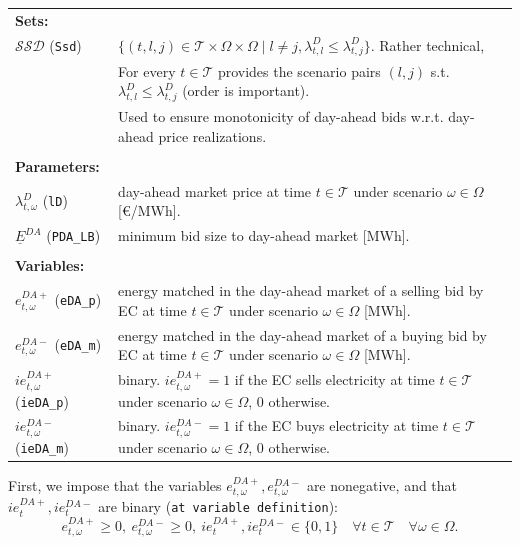 \begin{tabularx}{\textwidth}{l X}
\textbf{Sets:} \\
$\mathcal{SSD}$ (\texttt{Ssd}) & $\{(t, l, j) \in \mathcal{T} \times \Omega \times \Omega \mid l \neq j, \lambda^D_{t, l} \leq \lambda^D_{t, j} \}$. Rather technical, \\
& For every $t \in \mathcal{T}$ provides the scenario pairs $(l, j)$ s.t. $\lambda^D_{t, l} \leq \lambda^D_{t, j}$ (order is important). \\ 
& Used to ensure monotonicity of day-ahead bids w.r.t. day-ahead price realizations. \\
\\

\textbf{Parameters:} \\
$\lambda^D_{t, \omega}$ (\texttt{lD}) & day-ahead market price at time $t \in \mathcal{T}$ under scenario $\omega \in \Omega$ [\euro/MWh]. \\ 
$\underline{E}^{DA}$ (\texttt{PDA\_LB}) & minimum bid size to day-ahead market [MWh]. \\
\\

\textbf{Variables:} \\
$e^{DA+}_{t, \omega}$ (\texttt{eDA\_p}) & energy matched in the day-ahead market of a selling bid by EC at time $t \in \mathcal{T}$ under scenario $\omega \in \Omega$ [MWh]. \\ 
$e^{DA-}_{t, \omega}$ (\texttt{eDA\_m}) & energy matched in the day-ahead market of a buying bid by EC at time $t \in \mathcal{T}$ under scenario $\omega \in \Omega$ [MWh]. \\ 
$ie^{DA+}_{t, \omega}$ (\texttt{ieDA\_p}) & binary. $ie^{DA+}_{t, \omega} = 1$ if the EC sells electricity at time $t \in \mathcal{T}$ under scenario $\omega \in \Omega$, $0$ otherwise. \\ 
$ie^{DA-}_{t, \omega}$ (\texttt{ieDA\_m}) & binary. $ie^{DA-}_{t, \omega} = 1$ if the EC buys electricity at time $t \in \mathcal{T}$ under scenario $\omega \in \Omega$, $0$ otherwise. \\
\end{tabularx}

First, we impose that the variables $e^{DA+}_{t, \omega}, e^{DA-}_{t, \omega}$ are nonegative, and that $ie^{DA+}_t, ie^{DA-}_t$ are binary (\verb|at variable definition|):
\begin{equation} \label{EQ:DAVarDef}
	e^{DA+}_{t, \omega} \geq 0, \ e^{DA-}_{t, \omega} \geq 0, \ ie^{DA+}_t, ie^{DA-}_t \in \{0, 1 \} \quad \forall t \in \mathcal{T} \quad \forall \omega \in \Omega.
\end{equation}

